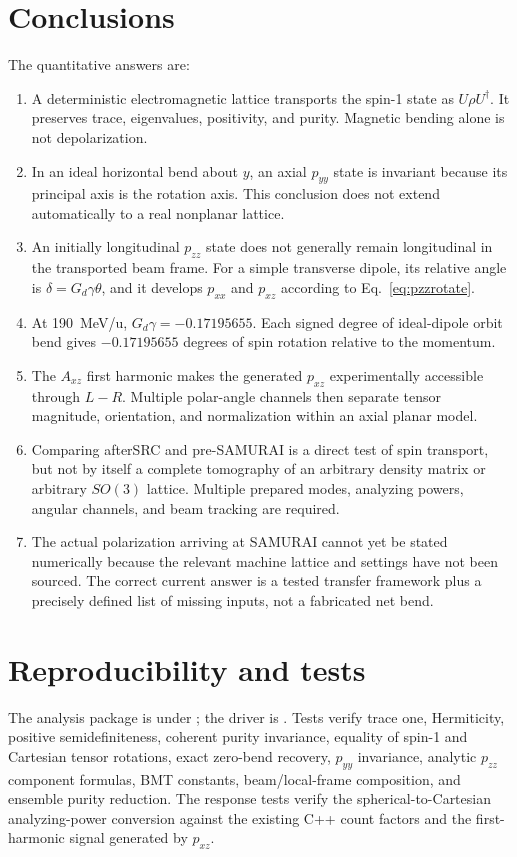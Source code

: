 \documentclass[11pt,a4paper]{article}
\begin{document}
\section{Conclusions}

The quantitative answers are:
\begin{enumerate}
 \item A deterministic electromagnetic lattice transports the spin-1 state as $U\rho U^\dagger$.  It preserves trace, eigenvalues, positivity, and purity.  Magnetic bending alone is not depolarization.
 \item In an ideal horizontal bend about $y$, an axial $p_{yy}$ state is invariant because its principal axis is the rotation axis.  This conclusion does not extend automatically to a real nonplanar lattice.
 \item An initially longitudinal $p_{zz}$ state does not generally remain longitudinal in the transported beam frame.  For a simple transverse dipole, its relative angle is $\delta=G_d\gamma\theta$, and it develops $p_{xx}$ and $p_{xz}$ according to Eq.~\eqref{eq:pzzrotate}.
 \item At \SI{190}{MeV/u}, $G_d\gamma=-0.17195655$.  Each signed degree of ideal-dipole orbit bend gives $-0.17195655$ degrees of spin rotation relative to the momentum.
 \item The $A_{xz}$ first harmonic makes the generated $p_{xz}$ experimentally accessible through $L-R$.  Multiple polar-angle channels then separate tensor magnitude, orientation, and normalization within an axial planar model.
 \item Comparing afterSRC and pre-SAMURAI is a direct test of spin transport, but not by itself a complete tomography of an arbitrary density matrix or arbitrary $SO(3)$ lattice.  Multiple prepared modes, analyzing powers, angular channels, and beam tracking are required.
 \item The actual polarization arriving at SAMURAI cannot yet be stated numerically because the relevant machine lattice and settings have not been sourced.  The correct current answer is a tested transfer framework plus a precisely defined list of missing inputs, not a fabricated net bend.
\end{enumerate}

\appendix
\section{Reproducibility and tests}

The analysis package is under ; the driver is
.  Tests verify trace one, Hermiticity, positive semidefiniteness, coherent purity invariance, equality of spin-1 and Cartesian tensor rotations, exact zero-bend recovery, $p_{yy}$ invariance, analytic $p_{zz}$ component formulas, BMT constants, beam/local-frame composition, and ensemble purity reduction.  The response tests verify the spherical-to-Cartesian analyzing-power conversion against the existing C++ count factors and the first-harmonic signal generated by $p_{xz}$.



\end{document}
